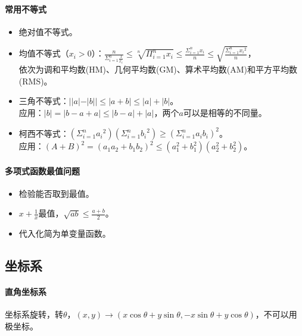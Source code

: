 \documentclass[
12pt, %
a4paper, 
oneside, %
]{scrartcl}
\begin{document}
\paragraph{常用不等式}
\begin{itemize}
\item 绝对值不等式。
\item 均值不等式（$ x_i > 0 $）：$ \frac{n}{\Sigma_{i = 1}^n \frac{1}{x_i}} \leq \sqrt[n]{\Pi_{i = 1}^n x_i} \leq \frac{\Sigma_{i = 1}^n x_i}{n} \leq \sqrt{\frac{\Sigma_{i = 1}^n {x_i}^2}{n}} $， \\
依次为调和平均数(HM)、几何平均数(GM)、算术平均数(AM)和平方平均数(RMS)。
\item 三角不等式：$ ||a|-|b|| \leq |a + b| \leq |a| + |b| $。 \\
应用：$ |b| = |b - a + a| \leq |b - a| + |a| $，两个$ a $可以是相等的不同量。
\item 柯西不等式：$ (\Sigma_{i = 1}^n {a_i}^2)(\Sigma_{i = 1}^n {b_i}^2) \geq (\Sigma_{i = 1}^n {a_i}{b_i})^2 $。 \\
应用：$ (A + B)^2 = (a_1 a_2 + b_1 b_2)^2 \leq (a_1^2 + b_1^2)(a_2^2 + b_2^2) $。
\end{itemize}
\paragraph{多项式函数最值问题}
\begin{itemize}
\item 检验能否取到最值。
\item $ x + \frac{1}{x} $最值，$ \sqrt{ab} \leq \frac{a + b}{2} $。
\item 代入化简为单变量函数。
\end{itemize}
\subsection[坐标系]{坐标系}
\paragraph{直角坐标系}
坐标系旋转，转$ \theta $，$ (x, y) \to (x \cos\theta + y \sin\theta, -x \sin\theta + y \cos\theta) $，不可以用极坐标。
\end{document}

